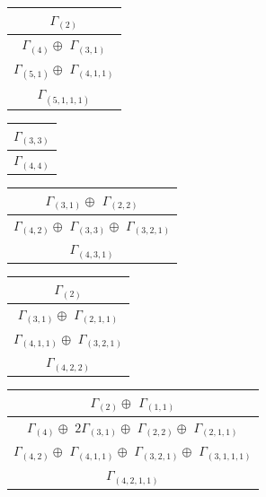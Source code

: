 \documentclass[main.tex]{subfiles}
\begin{document}
\begin{minipage}{.2\textwidth}
\centering
\begin{tabular}{c}
$\Gamma_{(
2
)}$
\\ \hline
$\Gamma_{(
4
)} \oplus$
$\Gamma_{(
3 , 
1
)}$
\\ \hline
$\Gamma_{(
5 , 
1
)} \oplus$
$\Gamma_{(
4 , 
1 , 
1
)}$
\\ \hline
$\Gamma_{(
5 , 
1 , 
1 , 
1
)}$
\\
\end{tabular}\end{minipage}
\begin{minipage}{.2\textwidth}
\centering
\begin{tabular}{c}
$\Gamma_{(
3 , 
3
)}$
\\ \hline
$\Gamma_{(
4 , 
4
)}$
\\
\end{tabular}\end{minipage}
\begin{minipage}{.3\textwidth}
\centering
\begin{tabular}{c}
$\Gamma_{(
3 , 
1
)} \oplus$
$\Gamma_{(
2 , 
2
)}$
\\ \hline
$\Gamma_{(
4 , 
2
)} \oplus$
$\Gamma_{(
3 , 
3
)} \oplus$
$\Gamma_{(
3 , 
2 , 
1
)}$
\\ \hline
$\Gamma_{(
4 , 
3 , 
1
)}$
\\
\end{tabular}\end{minipage}
\bigskip
\begin{minipage}{.25\textwidth}
\centering
\begin{tabular}{c}
$\Gamma_{(
2
)}$
\\ \hline
$\Gamma_{(
3 , 
1
)} \oplus$
$\Gamma_{(
2 , 
1 , 
1
)}$
\\ \hline
$\Gamma_{(
4 , 
1 , 
1
)} \oplus$
$\Gamma_{(
3 , 
2 , 
1
)}$
\\ \hline
$\Gamma_{(
4 , 
2 , 
2
)}$
\\
\end{tabular}\end{minipage}
\begin{minipage}{.5\textwidth}
\centering
\begin{tabular}{c}
$\Gamma_{(
2
)} \oplus$
$\Gamma_{(
1 , 
1
)}$
\\ \hline
$\Gamma_{(
4
)} \oplus$
$2\Gamma_{(
3 , 
1
)} \oplus$
$\Gamma_{(
2 , 
2
)} \oplus$
$\Gamma_{(
2 , 
1 , 
1
)}$
\\ \hline
$\Gamma_{(
4 , 
2
)} \oplus$
$\Gamma_{(
4 , 
1 , 
1
)} \oplus$
$\Gamma_{(
3 , 
2 , 
1
)} \oplus$
$\Gamma_{(
3 , 
1 , 
1 , 
1
)}$
\\ \hline
$\Gamma_{(
4 , 
2 , 
1 , 
1
)}$
\\
\end{tabular}\end{minipage}
\end{document}
